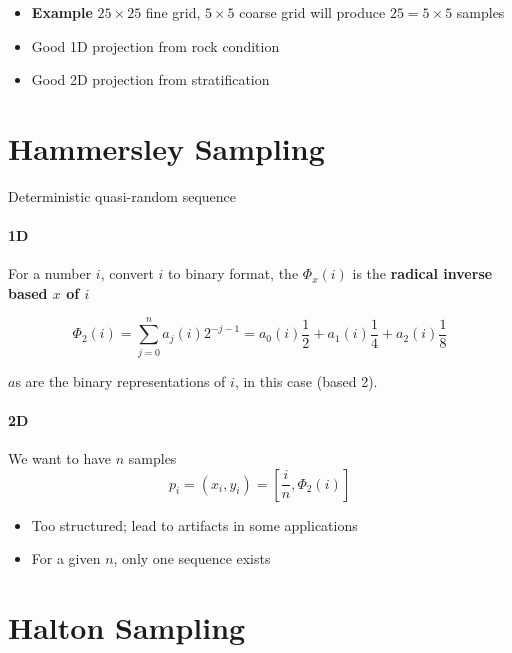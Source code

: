   \begin{itemize}
    \item \textbf{Example} $ 25 \times 25 $ fine grid, $ 5 \times 5 $ coarse grid
    will produce $ 25 = 5 \times 5 $ samples
    \item Good 1D projection from rock condition
    \item Good 2D projection from stratification
  \end{itemize}

\section{Hammersley Sampling}

  Deterministic quasi-random sequence

  \paragraph{1D} For a number $ i $, convert $ i $ to binary format, the
  $ \Phi_{x} \left( i \right) $ is the \textbf{radical inverse based $ x $ of $ i $}

  \begin{equation}
    \Phi_{2}\left( i \right)
      = \sum_{j = 0}^{n} a_{j} \left( i \right) 2^{-j - 1}
      = a_{0} \left( i \right) \frac{1}{2}
      + a_{1} \left( i \right) \frac{1}{4}
      + a_{2} \left( i \right) \frac{1}{8}
  \end{equation}

  $ a $s are the binary representations of $ i $, in this case (based 2).

  \paragraph{2D} We want to have $ n $ samples
  \begin{equation}
    p_{i}
      = \left( x_{i}, y_{i} \right)
      = \left[ \frac{i}{n}, \Phi_{2}\left( i \right) \right]
  \end{equation}

  \begin{itemize}
    \item Too structured; lead to artifacts in some applications
    \item For a given $ n $, only one sequence exists
  \end{itemize}

\section{Halton Sampling}

